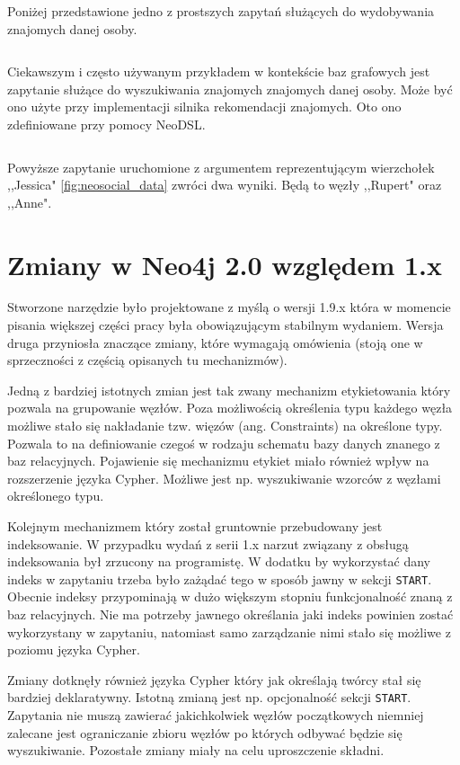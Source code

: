 \documentclass[brudnopis]{xmgr}
\begin{document}
Poniżej przedstawione jedno z prostszych zapytań służących do wydobywania znajomych danej osoby.

\inputminted{scala}{listings/scala/examples/socialnetwork/person-friends-query.scala}

Ciekawszym i często używanym przykładem w kontekście baz grafowych jest zapytanie służące do wyszukiwania znajomych znajomych danej osoby. Może być ono użyte przy implementacji silnika rekomendacji znajomych. Oto ono zdefiniowane przy pomocy NeoDSL.

\inputminted{scala}{listings/scala/examples/socialnetwork/person-fof-query.scala}

Powyższe zapytanie uruchomione z argumentem reprezentującym wierzchołek ,,Jessica" \ref{fig:neosocial_data} zwróci dwa wyniki. Będą to węzły ,,Rupert" oraz ,,Anne".

\chapter{Zmiany w Neo4j 2.0 względem 1.x}

Stworzone narzędzie było projektowane z myślą o wersji 1.9.x która w momencie pisania większej części pracy była obowiązującym stabilnym wydaniem. Wersja druga przyniosła znaczące zmiany, które wymagają omówienia (stoją one w sprzeczności z częścią opisanych tu mechanizmów).

Jedną z bardziej istotnych zmian jest tak zwany mechanizm etykietowania który pozwala na grupowanie węzłów. Poza możliwością określenia typu każdego węzła możliwe stało się nakładanie tzw. więzów (ang. Constraints) na określone typy. Pozwala to na definiowanie czegoś w rodzaju schematu bazy danych znanego z baz relacyjnych. Pojawienie się mechanizmu etykiet miało również wpływ na rozszerzenie języka Cypher. Możliwe jest np. wyszukiwanie wzorców z węzłami określonego typu.

Kolejnym mechanizmem który został gruntownie przebudowany jest indeksowanie. W przypadku wydań z serii 1.x narzut związany z obsługą indeksowania był zrzucony na programistę. W dodatku by wykorzystać dany indeks w zapytaniu trzeba było zażądać tego w sposób jawny w sekcji \texttt{START}. Obecnie indeksy przypominają w dużo większym stopniu funkcjonalność znaną z baz relacyjnych. Nie ma potrzeby jawnego określania jaki indeks powinien zostać wykorzystany w zapytaniu, natomiast samo zarządzanie nimi stało się możliwe z poziomu języka Cypher.

Zmiany dotknęły również języka Cypher który jak określają twórcy stał się bardziej deklaratywny. Istotną zmianą jest np. opcjonalność sekcji \texttt{START}. Zapytania nie muszą zawierać jakichkolwiek węzłów początkowych niemniej zalecane jest ograniczanie zbioru węzłów po których odbywać będzie się wyszukiwanie. Pozostałe zmiany miały na celu uproszczenie składni.
\end{document}
